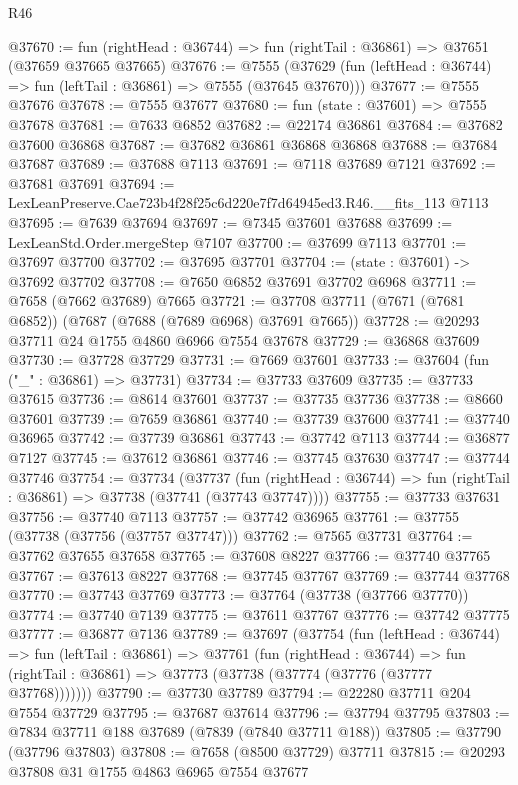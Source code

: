 \begin{lexlean}{R46}
\begin{coremodule}
@37670 := fun (rightHead : @36744) => fun (rightTail : @36861) => @37651 (@37659 @37665 @37665)
@37676 := @7555
    (@37629 (fun (leftHead : @36744) => fun (leftTail : @36861) => @7555 (@37645 @37670)))
@37677 := @7555 @37676
@37678 := @7555 @37677
@37680 := fun (state : @37601) => @7555 @37678
@37681 := @7633 @6852
@37682 := @22174 @36861
@37684 := @37682 @37600 @36868
@37687 := @37682 @36861 @36868 @36868
@37688 := @37684 @37687
@37689 := @37688 @7113
@37691 := @7118 @37689 @7121
@37692 := @37681 @37691
@37694 := LexLeanPreserve.Cae723b4f28f25c6d220e7f7d64945ed3.R46.__fits_113 @7113
@37695 := @7639 @37694
@37697 := @7345 @37601 @37688
@37699 := LexLeanStd.Order.mergeStep @7107
@37700 := @37699 @7113
@37701 := @37697 @37700
@37702 := @37695 @37701
@37704 := (state : @37601) -> @37692 @37702
@37708 := @7650 @6852 @37691 @37702 @6968
@37711 := @7658 (@7662 @37689) @7665
@37721 := @37708 @37711 (@7671 (@7681 @6852)) (@7687 (@7688 (@7689 @6968) @37691 @7665))
@37728 := @20293 @37711 @24 @1755 @4860 @6966 @7554 @37678
@37729 := @36868 @37609
@37730 := @37728 @37729
@37731 := @7669 @37601
@37733 := @37604 (fun ("_" : @36861) => @37731)
@37734 := @37733 @37609
@37735 := @37733 @37615
@37736 := @8614 @37601
@37737 := @37735 @37736
@37738 := @8660 @37601
@37739 := @7659 @36861
@37740 := @37739 @37600
@37741 := @37740 @36965
@37742 := @37739 @36861
@37743 := @37742 @7113
@37744 := @36877 @7127
@37745 := @37612 @36861
@37746 := @37745 @37630
@37747 := @37744 @37746
@37754 := @37734
    (@37737
      (fun (rightHead : @36744) => fun (rightTail : @36861) => @37738 (@37741 (@37743 @37747))))
@37755 := @37733 @37631
@37756 := @37740 @7113
@37757 := @37742 @36965
@37761 := @37755 (@37738 (@37756 (@37757 @37747)))
@37762 := @7565 @37731
@37764 := @37762 @37655 @37658
@37765 := @37608 @8227
@37766 := @37740 @37765
@37767 := @37613 @8227
@37768 := @37745 @37767
@37769 := @37744 @37768
@37770 := @37743 @37769
@37773 := @37764 (@37738 (@37766 @37770))
@37774 := @37740 @7139
@37775 := @37611 @37767
@37776 := @37742 @37775
@37777 := @36877 @7136
@37789 := @37697
    (@37754
      (fun (leftHead : @36744) =>
      fun (leftTail : @36861) =>
      @37761
        (fun (rightHead : @36744) =>
        fun (rightTail : @36861) => @37773 (@37738 (@37774 (@37776 (@37777 @37768)))))))
@37790 := @37730 @37789
@37794 := @22280 @37711 @204 @7554 @37729
@37795 := @37687 @37614
@37796 := @37794 @37795
@37803 := @7834 @37711 @188 @37689 (@7839 (@7840 @37711 @188))
@37805 := @37790 (@37796 @37803)
@37808 := @7658 (@8500 @37729) @37711
@37815 := @20293 @37808 @31 @1755 @4863 @6965 @7554 @37677

\end{coremodule}
\end{lexlean}
